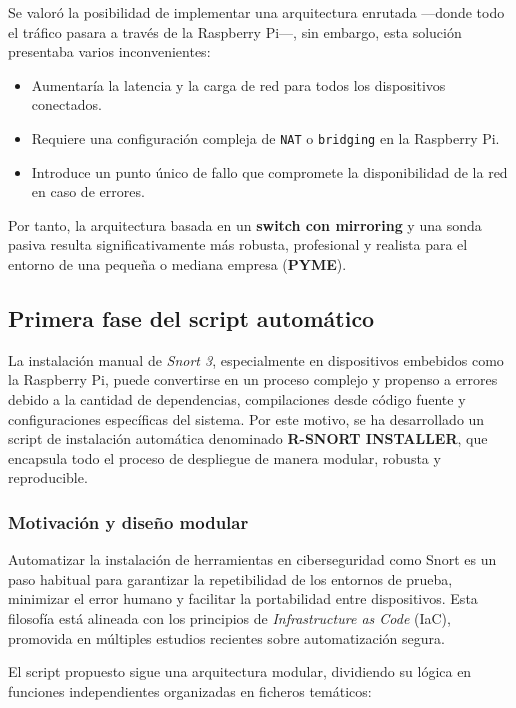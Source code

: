 \documentclass[12pt,a4paper]{report}
\begin{document}
Se valoró la posibilidad de implementar una arquitectura enrutada —donde todo el tráfico pasara a través de la Raspberry Pi—, sin embargo, esta solución presentaba varios inconvenientes:

\begin{itemize}
	\item Aumentaría la latencia y la carga de red para todos los dispositivos conectados.
	\item Requiere una configuración compleja de \texttt{NAT} o \texttt{bridging} en la Raspberry Pi.
	\item Introduce un punto único de fallo que compromete la disponibilidad de la red en caso de errores.
\end{itemize}

Por tanto, la arquitectura basada en un \textbf{switch con mirroring} y una sonda pasiva resulta significativamente más robusta, profesional y realista para el entorno de una pequeña o mediana empresa (\textbf{PYME}).


\subsection{Primera fase del script automático}
La instalación manual de \textit{Snort 3}, especialmente en dispositivos embebidos como la Raspberry Pi, puede convertirse en un proceso complejo y propenso a errores debido a la cantidad de dependencias, compilaciones desde código fuente y configuraciones específicas del sistema. Por este motivo, se ha desarrollado un script de instalación automática denominado \textbf{R-SNORT INSTALLER}, que encapsula todo el proceso de despliegue de manera modular, robusta y reproducible.

\subsubsection{Motivación y diseño modular}

Automatizar la instalación de herramientas en ciberseguridad como Snort es un paso habitual para garantizar la repetibilidad de los entornos de prueba, minimizar el error humano y facilitar la portabilidad entre dispositivos. Esta filosofía está alineada con los principios de \textit{Infrastructure as Code} (IaC), promovida en múltiples estudios recientes sobre automatización segura.
\newline

El script propuesto sigue una arquitectura modular, dividiendo su lógica en funciones independientes organizadas en ficheros temáticos:
\end{document}
